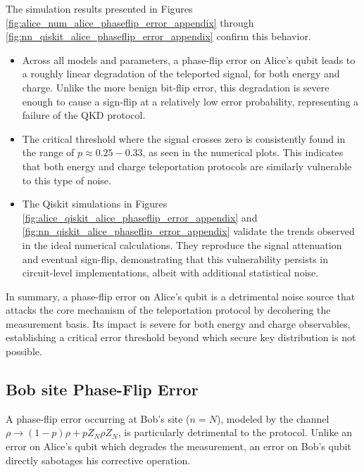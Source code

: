 The simulation results presented in Figures \ref{fig:alice_num_alice_phaseflip_error_appendix} through \ref{fig:nn_qiskit_alice_phaseflip_error_appendix} confirm this behavior. 
\begin{itemize}
    \item Across all models and parameters, a phase-flip error on Alice's qubit leads to a roughly linear degradation of the teleported signal, for both energy and charge. Unlike the more benign bit-flip error, this degradation is severe enough to cause a sign-flip at a relatively low error probability, representing a failure of the QKD protocol.
    
    \item The critical threshold where the signal crosses zero is consistently found in the range of $p \approx 0.25-0.33$, as seen in the numerical plots. This indicates that both energy and charge teleportation protocols are similarly vulnerable to this type of noise.
    
    \item The Qiskit simulations in Figures \ref{fig:alice_qiskit_alice_phaseflip_error_appendix} and \ref{fig:nn_qiskit_alice_phaseflip_error_appendix} validate the trends observed in the ideal numerical calculations. They reproduce the signal attenuation and eventual sign-flip, demonstrating that this vulnerability persists in circuit-level implementations, albeit with additional statistical noise.
\end{itemize}
In summary, a phase-flip error on Alice's qubit is a detrimental noise source that attacks the core mechanism of the teleportation protocol by decohering the measurement basis. Its impact is severe for both energy and charge observables, establishing a critical error threshold beyond which secure key distribution is not possible.

\subsection{Bob site Phase-Flip Error}



A phase-flip error occurring at Bob's site ($n=N$), modeled by the channel $\rho \rightarrow (1-p)\rho + pZ_{N}\rho Z_{N}$, is particularly detrimental to the protocol. Unlike an error on Alice's qubit which degrades the measurement, an error on Bob's qubit directly sabotages his corrective operation.

